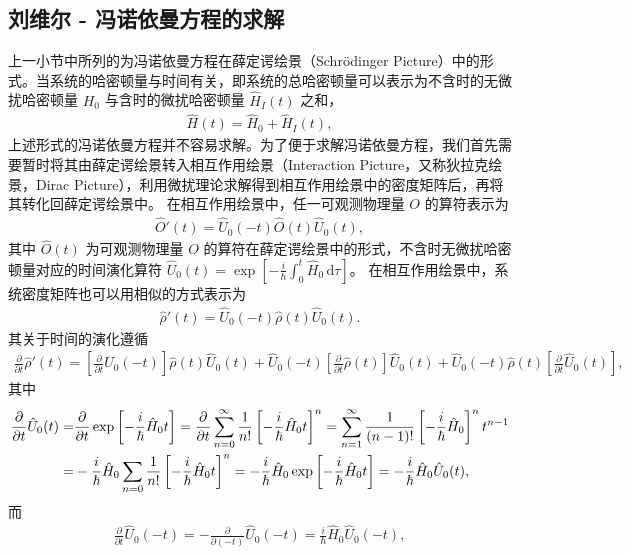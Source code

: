 \documentclass{thesis}
\begin{document}
\subsection{刘维尔 - 冯诺依曼方程的求解}
\label{von Neumann Equ sol}
上一小节中所列的为冯诺依曼方程在薛定谔绘景（Schrödinger Picture）中的形式。当系统的哈密顿量与时间有关，即系统的总哈密顿量可以表示为不含时的无微扰哈密顿量 $H_0$ 与含时的微扰哈密顿量 $\hat{H}_I(t)$ 之和，
\begin{align}
    \hat{H}(t)=\hat{H}_0+\hat{H}_I(t),
\end{align}
上述形式的冯诺依曼方程并不容易求解。为了便于求解冯诺依曼方程，我们首先需要暂时将其由薛定谔绘景转入相互作用绘景（Interaction Picture，又称狄拉克绘景，Dirac Picture），利用微扰理论求解得到相互作用绘景中的密度矩阵后，再将其转化回薛定谔绘景中。
在相互作用绘景中，任一可观测物理量 $O$ 的算符表示为
\begin{align}
    \hat{O}'(t)=\hat{U}_0(-t)\hat{O}(t)\hat{U}_0(t),
\end{align}
其中 $\hat{O}(t)$ 为可观测物理量 $O$ 的算符在薛定谔绘景中的形式，不含时无微扰哈密顿量对应的时间演化算符 $\hat{U}_0(t)=\exp\left[-\frac{i}{\hbar}\int_0^t\hat{H}_0\,\mathrm{d}\tau\right]$。
在相互作用绘景中，系统密度矩阵也可以用相似的方式表示为
\begin{align}
    \hat{\rho}'(t)=\hat{U}_0(-t)\hat{\rho}(t)\hat{U}_0(t).
\end{align}
其关于时间的演化遵循
\begin{align}
    \frac{\partial}{\partial t}\hat{\rho}'(t)=\left[\frac{\partial}{\partial t}\hat{U}_0(-t)\right]\hat{\rho}(t)\hat{U}_0(t)+\hat{U}_0(-t)\left[\frac{\partial}{\partial t}\hat{\rho}(t)\right]\hat{U}_0(t)+\hat{U}_0(-t)\hat{\rho}(t)\left[\frac{\partial}{\partial t}\hat{U}_0(t)\right],
\end{align}
其中
\begin{align}
    \notag\frac{\partial}{\partial t}\hat{U}_0(t)=&\frac{\partial}{\partial t}\exp\left[-\frac{i}{\hbar}\hat{H}_0t\right]=\frac{\partial}{\partial t}\sum_{n=0}^{\infty}\frac{1}{n!}\left[-\frac{i}{\hbar}\hat{H}_0t\right]^n=\sum_{n=1}^{\infty}\frac{1}{(n-1)!}\left[-\frac{i}{\hbar}\hat{H}_0\right]^nt^{n-1}\\
    =&-\frac{i}{\hbar}\hat{H}_0\sum_{n=0}\frac{1}{n!}\left[-\frac{i}{\hbar}\hat{H}_0t\right]^n=-\frac{i}{\hbar}\hat{H}_0\exp\left[-\frac{i}{\hbar}\hat{H}_0t\right]=-\frac{i}{\hbar}\hat{H}_0\hat{U}_0(t),
\end{align}
而
\begin{align}
    \frac{\partial}{\partial t}\hat{U}_0(-t)=-\frac{\partial}{\partial(-t)}\hat{U}_0(-t)=\frac{i}{\hbar}\hat{H}_0\hat{U}_0(-t),
\end{align}
\end{document}
